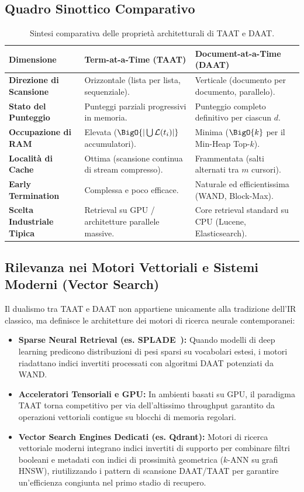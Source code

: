 \subsection{Quadro Sinottico Comparativo}

\begin{table}[H]
\centering
\small
\begin{tabularx}{\linewidth}{l X X}
\toprule
\textbf{Dimensione} & \textbf{Term-at-a-Time (TAAT)} & \textbf{Document-at-a-Time (DAAT)} \\
\midrule
\textbf{Direzione di Scansione} & Orizzontale (lista per lista, sequenziale). & Verticale (documento per documento, parallelo). \\
\addlinespace
\textbf{Stato del Punteggio} & Punteggi parziali progressivi in memoria. & Punteggio completo definitivo per ciascun $d$. \\
\addlinespace
\textbf{Occupazione di RAM} & Elevata ($\BigO{|\bigcup \mathcal{L}(t_i)|}$ accumulatori). & Minima ($\BigO{k}$ per il Min-Heap Top-$k$). \\
\addlinespace
\textbf{Localit\`a di Cache} & Ottima (scansione continua di stream compresso). & Frammentata (salti alternati tra $m$ cursori). \\
\addlinespace
\textbf{Early Termination} & Complessa e poco efficace. & Naturale ed efficientissima (WAND, Block-Max). \\
\addlinespace
\textbf{Scelta Industriale Tipica} & Retrieval su GPU / architetture parallele massive. & Core retrieval standard su CPU (Lucene, Elasticsearch). \\
\bottomrule
\end{tabularx}
\caption{Sintesi comparativa delle propriet\`a architetturali di TAAT e DAAT.}
\label{tab:taat-vs-daat-summary}
\end{table}

\subsection{Rilevanza nei Motori Vettoriali e Sistemi Moderni (Vector Search)}
Il dualismo tra TAAT e DAAT non appartiene unicamente alla tradizione dell'IR classico, ma definisce le architetture dei motori di ricerca neurale contemporanei:
\begin{itemize}
    \item \textbf{Sparse Neural Retrieval (es. SPLADE~\cite{formal2021}):} Quando modelli di deep learning predicono distribuzioni di pesi sparsi su vocabolari estesi, i motori riadattano indici invertiti processati con algoritmi DAAT potenziati da WAND.
    \item \textbf{Acceleratori Tensoriali e GPU:} In ambienti basati su GPU, il paradigma TAAT torna competitivo per via dell'altissimo throughput garantito da operazioni vettoriali contigue su blocchi di memoria regolari.
    \item \textbf{Vector Search Engines Dedicati (es. Qdrant):} Motori di ricerca vettoriale moderni integrano indici invertiti di supporto per combinare filtri booleani e metadati con indici di prossimit\`a geometrica ($k$-ANN su grafi HNSW), riutilizzando i pattern di scansione DAAT/TAAT per garantire un'efficienza congiunta nel primo stadio di recupero.
\end{itemize}
